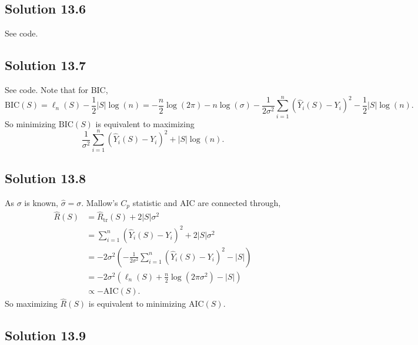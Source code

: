 \subsection*{Solution 13.6}

See code.


\subsection*{Solution 13.7}

See code.
Note that for BIC,
\begin{equation*}
    \mathrm{BIC}(S) = \ell_n(S) - \frac{1}{2}|S|\log(n)
        = -\frac{n}{2}\log(2\pi) - n\log(\sigma) - \frac{1}{2\sigma^2} \sum_{i = 1}^n (\hat{Y}_i(S) - Y_i)^2 - \frac{1}{2}|S| \log(n).
\end{equation*}
So minimizing $\mathrm{BIC}(S)$ is equivalent to maximizing
\begin{equation*}
    \frac{1}{\sigma^2}\sum_{i = 1}^n (\hat{Y}_i(S) - Y_i)^2 + |S|\log(n).
\end{equation*}


\subsection*{Solution 13.8}

As $\sigma$ is known, $\hat{\sigma} = \sigma$.
Mallow's $C_p$ statistic and AIC are connected through,
\begin{equation*}
    \begin{split}
        \hat{R}(S)
            &= \hat{R}_{\mathrm{tr}}(S) + 2|S|\sigma^2 \\
            &= \sum_{i = 1}^n (\hat{Y}_i(S) - Y_i)^2 + 2|S|\sigma^2 \\
            &= -2\sigma^2 \left( -\frac{1}{2\sigma^2} \sum_{i = 1}^n (\hat{Y}_i(S) - Y_i)^2 - |S| \right) \\
            &= -2\sigma^2 \left( \ell_n(S) + \frac{n}{2} \log(2\pi\sigma^2) - |S| \right) \\
            &\propto -\mathrm{AIC}(S).
    \end{split}
\end{equation*}
So maximizing $\hat{R}(S)$ is equivalent to minimizing $\mathrm{AIC}(S)$.


\subsection*{Solution 13.9}

